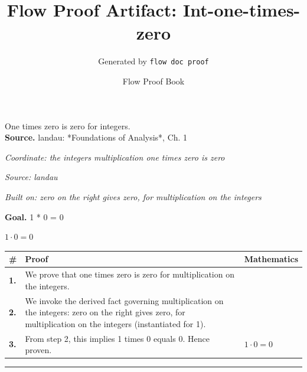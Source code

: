 \documentclass[11pt]{article}
\title{Flow Proof Artifact: Int-one-times-zero}
\author{Generated by \texttt{flow doc proof}}
\date{Flow Proof Book}
\theoremstyle{definition}
\begin{document}
\maketitle
One times zero is zero for integers.\\[0.5em]
\textbf{Source.} landau: *Foundations of Analysis*, Ch. 1\\[0.5em]
\bigskip
{}\par
\smallskip\noindent\textit{Coordinate: the integers \cdot multiplication \cdot one times zero is zero}\par
\smallskip\noindent\textit{Source: landau}\par
\smallskip\noindent\textit{Built on: zero on the right gives zero, for multiplication on the integers}\par
\medskip
\noindent\textbf{Goal.} 1 * 0 = 0\par
\noindent$\displaystyle 1 \cdot 0 = 0$\par
\medskip
\noindent
\begin{tabular}{@{} >{\raggedright\arraybackslash}p{} >{\raggedright\arraybackslash}p{} >{\raggedleft\arraybackslash}p{} @{}}
\textbf{\#} & \textbf{Proof} & \textbf{Mathematics} \\
\midrule
\textbf{1.} & We prove that one times zero is zero for multiplication on the integers. & \\[0.45em]
\textbf{2.} & We invoke the derived fact governing multiplication on the integers: zero on the right gives zero, for multiplication on the integers (instantiated for 1). & \\[0.45em]
\textbf{3.} & From step 2, this implies 1 times 0 equals 0. Hence proven. & $\displaystyle 1 \cdot 0 = 0$ \\[0.45em]
\bottomrule
\end{tabular}
\label{thm:Int-multiplication-one_times_zero_is_zero}
\par\medskip\hrule
\end{document}
